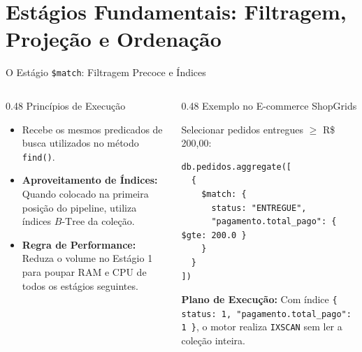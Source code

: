 \section[Estágios Fundamentais: Filtragem e Projeção]{Estágios Fundamentais: Filtragem, Projeção e Ordenação}

\begin{frame}[fragile]{O Estágio \texttt{\$match}: Filtragem Precoce e Índices}
  \vspace{0.1cm}
  \begin{columns}[t,onlytextwidth]
    \begin{column}{0.48\textwidth}
      \alert{Princípios de Execução}\par
      \footnotesize
      \begin{itemize}
        \item Recebe os mesmos predicados de busca utilizados no método \lstinline[language=mongosh, basicstyle=\footnotesize\ttfamily]|find()|.
        \item \textbf{Aproveitamento de Índices:} Quando colocado na primeira posição do pipeline, utiliza índices $B\text{-Tree}$ da coleção.
        \item \textbf{Regra de Performance:} Reduza o volume no Estágio 1 para poupar RAM e CPU de todos os estágios seguintes.
      \end{itemize}
    \end{column}
    \begin{column}{0.48\textwidth}
      \alert{Exemplo no E-commerce ShopGrids}\par
      \vspace{0.05cm}
      \scriptsize
      Selecionar pedidos entregues $\ge$ R\$ 200,00:
      \vspace{0.05cm}
      \begin{lstlisting}[language=mongosh, basicstyle=\scriptsize\ttfamily]
db.pedidos.aggregate([
  {
    $match: {
      status: "ENTREGUE",
      "pagamento.total_pago": { $gte: 200.0 }
    }
  }
])
      \end{lstlisting}
      \vspace{0.05cm}
      \textbf{Plano de Execução:} Com índice \lstinline[language=mongosh, basicstyle=\scriptsize\ttfamily]|{ status: 1, "pagamento.total_pago": 1 }|, o motor realiza \texttt{IXSCAN} sem ler a coleção inteira.
    \end{column}
  \end{columns}
\end{frame}

